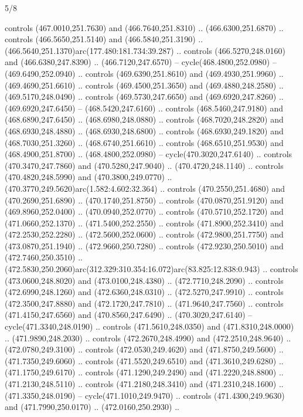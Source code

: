 \begin{flagdescription}{5/8}
\begin{scope}[xshift=0.5\flaglength,yshift=0.5\flagwidth,scale=\flagwidth/475.63]
\begin{scope}[y=0.8pt, x=0.8pt, yscale=-1, xscale=1,shift={(-450,-300)}]
\begin{scope}[cm={{1.0,0.0,0.0,1.0,(-0.0002,0.12556)}},cm={{1.0,0.0,0.0,1.0,(0.00179,0.0)}}]
\begin{scope}[cm={{1.00926,0.0,0.0,1.00926,(-3.1541,-2.47648)}}]
  controls (467.0010,251.7630) and (466.7640,251.8310) .. (466.6300,251.6870) ..
  controls (466.5650,251.5140) and (466.5840,251.3190) ..
  (466.5640,251.1370)arc(177.480:181.734:39.287) .. controls (466.5270,248.0160)
  and (466.6380,247.8390) .. (466.7120,247.6570) -- cycle(468.4800,252.0980) --
  (469.6490,252.0940) .. controls (469.6390,251.8610) and (469.4930,251.9960) ..
  (469.4690,251.6610) .. controls (469.4500,251.3650) and (469.4880,248.2580) ..
  (469.5170,248.0490) .. controls (469.5730,247.6650) and (469.6920,247.8260) ..
  (469.6920,247.6450) -- (468.5420,247.6160) .. controls (468.5460,247.9180) and
  (468.6890,247.6450) .. (468.6980,248.0880) .. controls (468.7020,248.2820) and
  (468.6930,248.4880) .. (468.6930,248.6800) .. controls (468.6930,249.1820) and
  (468.7030,251.3260) .. (468.6740,251.6610) .. controls (468.6510,251.9530) and
  (468.4900,251.8700) .. (468.4800,252.0980) -- cycle(470.3020,247.6140) ..
  controls (470.3470,247.7860) and (470.5280,247.9040) .. (470.4720,248.1140) ..
  controls (470.4820,248.5990) and (470.3800,249.0770) ..
  (470.3770,249.5620)arc(1.582:4.602:32.364) .. controls (470.2550,251.4680) and
  (470.2690,251.6890) .. (470.1740,251.8750) .. controls (470.0870,251.9120) and
  (469.8960,252.0400) .. (470.0940,252.0770) .. controls (470.5710,252.1720) and
  (471.0660,252.1370) .. (471.5400,252.2550) .. controls (471.8900,252.3410) and
  (472.2530,252.2280) .. (472.5600,252.0600) .. controls (472.9800,251.7750) and
  (473.0870,251.1940) .. (472.9660,250.7280) .. controls (472.9230,250.5010) and
  (472.7460,250.3510) ..
  (472.5830,250.2060)arc(312.329:310.354:16.072)arc(83.825:12.838:0.943) ..
  controls (473.0600,248.8020) and (473.0100,248.4380) .. (472.7710,248.2090) ..
  controls (472.6990,248.1260) and (472.6360,248.0310) .. (472.5270,247.9910) ..
  controls (472.3500,247.8880) and (472.1720,247.7810) .. (471.9640,247.7560) ..
  controls (471.4150,247.6560) and (470.8560,247.6490) .. (470.3020,247.6140) --
  cycle(471.3340,248.0190) .. controls (471.5610,248.0350) and
  (471.8310,248.0000) .. (471.9890,248.2030) .. controls (472.2670,248.4990) and
  (472.2510,248.9640) .. (472.0780,249.3100) .. controls (472.0530,249.4620) and
  (471.8750,249.5600) .. (471.7350,249.6060) .. controls (471.5520,249.6510) and
  (471.3610,249.6280) .. (471.1750,249.6170) .. controls (471.1290,249.2490) and
  (471.2220,248.8800) .. (471.2130,248.5110) .. controls (471.2180,248.3410) and
  (471.2310,248.1600) .. (471.3350,248.0190) -- cycle(471.1010,249.9470) ..
  controls (471.4300,249.9630) and (471.7990,250.0170) .. (472.0160,250.2930) ..

\end{scope}
\end{scope}
\end{scope}
\end{scope}
\end{flagdescription}
